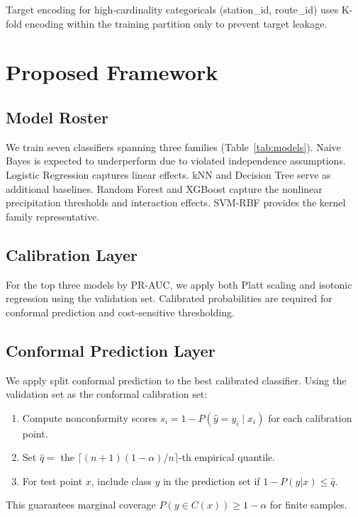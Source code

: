 \documentclass[conference]{IEEEtran}
\begin{document}
Target encoding for high-cardinality categoricals (station\_id, route\_id) uses K-fold
encoding within the training partition only to prevent target leakage.

\section{Proposed Framework}

\subsection{Model Roster}

We train seven classifiers spanning three families (Table~\ref{tab:models}).
Naive Bayes is expected to underperform due to violated independence assumptions.
Logistic Regression captures linear effects. kNN and Decision Tree serve as additional
baselines. Random Forest and XGBoost capture the nonlinear precipitation thresholds
and interaction effects. SVM-RBF provides the kernel family representative.

\subsection{Calibration Layer}

For the top three models by PR-AUC, we apply both Platt scaling \cite{platt1999probabilistic}
and isotonic regression \cite{niculescu2005predicting} using the validation set.
Calibrated probabilities are required for conformal prediction and cost-sensitive thresholding.

\subsection{Conformal Prediction Layer}

We apply split conformal prediction \cite{vovk2005algorithmic} to the best calibrated
classifier. Using the validation set as the conformal calibration set:
\begin{enumerate}
  \item Compute nonconformity scores $s_i = 1 - P(\hat{y} = y_i \mid x_i)$ for each
        calibration point.
  \item Set $\hat{q} = $ the $\lceil (n+1)(1-\alpha)/n \rceil$-th empirical quantile.
  \item For test point $x$, include class $y$ in the prediction set if $1 - P(y|x) \leq \hat{q}$.
\end{enumerate}
This guarantees marginal coverage $P(y \in C(x)) \geq 1 - \alpha$ for finite samples.
\end{document}
